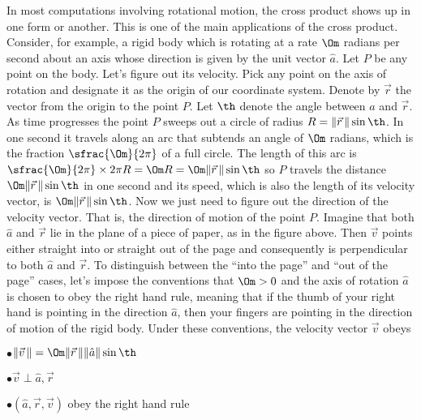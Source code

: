 In most computations involving rotational motion, the cross product shows
up in one form or another. This is one of the main applications of the cross
product. Consider, for example, a rigid body which is rotating 
 at a rate $\Om$ radians per second about an axis whose direction is given
by the unit vector $\hat a$. Let $P$ be any point
on the body. Let's figure out its velocity. Pick any point on the axis
of rotation and designate it as the origin of our coordinate system. Denote
by $\vec r$ the vector from the origin to the point $P$. Let $\th$ denote
the angle between $\hat a$ and $\vec r$. As time progresses the point $P$
sweeps out a circle of radius $R=\|\vec r\,\|\sin\th$. 
In one second it travels along an arc that subtends an angle of $\Om$ radians,
which is the fraction $\sfrac{\Om}{2\pi}$ of a full circle. 
 The length of this arc is
$\sfrac{\Om}{2\pi}\times 2\pi R=\Om R=\Om\|\vec r\,\|\sin\th$ so $P$ travels the distance $\Om\|\vec r\,\|\sin\th$
in one second and its speed, which is also the length of its velocity vector,
is $\Om\|\vec r\,\|\sin\th$. Now we just need to figure out the direction
of the velocity vector. That is, the direction of motion of the point $P$.
Imagine that both $\hat a$ and $\vec r$ lie in the plane of a piece of paper, 
as in the figure above. Then $\vec v$ points either straight into 
or straight out of the page and consequently is perpendicular
to both $\hat a$ and $\vec r$. To distinguish between the ``into the page''
and ``out of the page'' cases, let's impose the conventions that 
$\Om>0$ and the axis of rotation $\hat a$ is chosen to obey the right hand
 rule, meaning that if the thumb of
your right hand is pointing in the direction $\hat a$, then your fingers
are pointing in the direction of motion of the rigid body.  Under these
conventions, the velocity vector $\vec v$ obeys
\item{$\bullet$}$\|\vec v\,\|=\Om\|\vec r\,\|\|\hat a\|\sin\th$
\item{$\bullet$}$\vec v\perp\hat a,\vec r$
\item{$\bullet$}$(\hat a,\vec r,\vec v)$ obey the right hand rule

